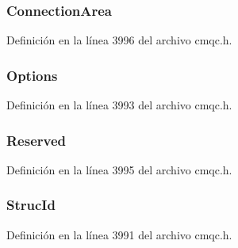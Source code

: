 \subsubsection[{Connection\+Area}]{ Connection\+Area}\label{structtag_m_q_c_t_l_o_a58c83e52e3187c1579e9aeb6c52ded13}


Definición en la línea 3996 del archivo cmqc.\+h.

\hypertarget{structtag_m_q_c_t_l_o_ad7aff2d6c6044809464380998d24ec5c}{}
\subsubsection[{Options}]{ Options}\label{structtag_m_q_c_t_l_o_ad7aff2d6c6044809464380998d24ec5c}


Definición en la línea 3993 del archivo cmqc.\+h.

\hypertarget{structtag_m_q_c_t_l_o_a94dbfe0ea37eb47bd07d4d79d7104b2c}{}
\subsubsection[{Reserved}]{ Reserved}\label{structtag_m_q_c_t_l_o_a94dbfe0ea37eb47bd07d4d79d7104b2c}


Definición en la línea 3995 del archivo cmqc.\+h.

\hypertarget{structtag_m_q_c_t_l_o_a0530922ca944569b52601d74941f96e4}{}
\subsubsection[{Struc\+Id}]{ Struc\+Id}\label{structtag_m_q_c_t_l_o_a0530922ca944569b52601d74941f96e4}


Definición en la línea 3991 del archivo cmqc.\+h.

\hypertarget{structtag_m_q_c_t_l_o_a0656ef8f766b3907d394d88a35d7b7e9}{}
